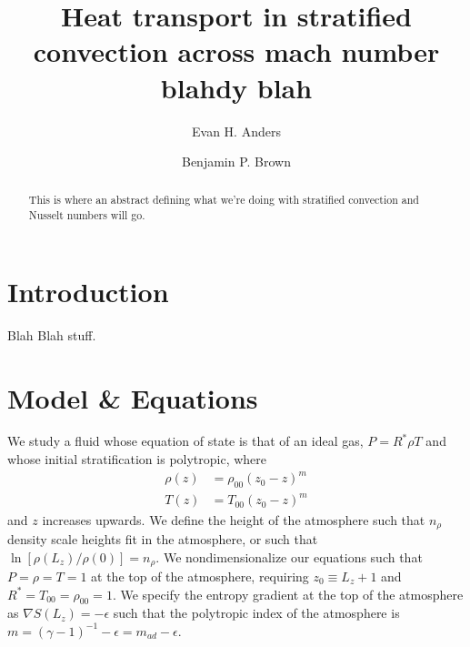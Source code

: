 \documentclass[aps, prl, twocolumn, groupedaddress]{revtex4-1}
\newcommand{\grad}{\ensuremath{\nabla}}
\begin{document}
\author{Evan H. Anders}
\author{Benjamin P. Brown}
\title{Heat transport in stratified convection across mach number blahdy blah}

\begin{abstract}
This is where an abstract defining what we're doing with stratified convection and Nusselt numbers will go.
\end{abstract}
\maketitle


\section{Introduction \label{section:intro}}
Blah Blah stuff.

\section{Model \& Equations \label{section:model}}
We study a fluid whose equation of state is that of an ideal gas, $P = R^*\rho T$ and whose
initial stratification is polytropic, where
\begin{equation}
\begin{split}
\rho(z) &= \rho_{00}(z_0 - z)^m \\
T(z)    &= T_{00}(z_0 - z)^m
\end{split}
\end{equation}
and $z$ increases upwards. We define the height of the atmosphere such that $n_\rho$ density scale heights fit in the
atmosphere, or such that $\ln[\rho(L_{z})/\rho(0)] = n_\rho$.  We nondimensionalize our equations such that 
$P = \rho = T = 1$ at the top of the atmosphere, requiring $z_0 \equiv L_z + 1$ and $R^* = T_{00} = \rho_{00} = 1$.  
We specify the entropy gradient at the top of the atmosphere as $\grad S(L_z) = -\epsilon$ such that the
polytropic index of the atmosphere is $m = (\gamma - 1)^{-1} - \epsilon = m_{ad} - \epsilon$.
\end{document}
